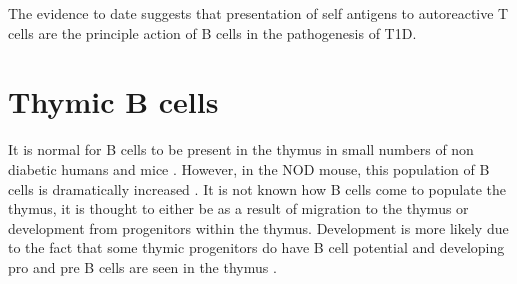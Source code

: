 The evidence to date suggests that presentation of self antigens to autoreactive T cells are the principle action of B cells in the pathogenesis of T1D.






\section{Thymic B cells}
\label{sec:thymicBcells}
 
It is normal for B cells to be present in the thymus in small numbers \citep{Isaacson1987, Akashi2000, Miyama1988} of non diabetic humans \citep{Isaacson1987} and mice \citep{Akashi2000}. 
However, in the NOD mouse, this population of B cells is dramatically increased \citep{OReilly1994, Serreze1998}.
It is not known how B cells come to populate the thymus, it is thought to either be as a result of migration to the thymus or development from progenitors within the thymus.
Development is more likely due to the fact that some thymic progenitors do have B cell potential \citep{Porritt2004} and developing pro and pre B cells are seen in the thymus \citep{Akashi2000}.



